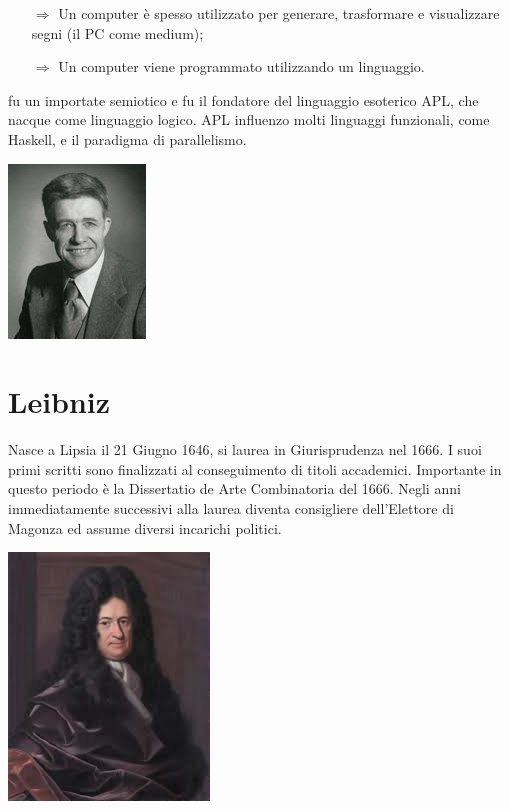 \begin{itemize}
    \item [$\Rightarrow$] Un computer è spesso utilizzato per generare, trasformare e visualizzare segni (il PC come medium);
    \item [$\Rightarrow$] Un computer viene programmato utilizzando un linguaggio.
\end{itemize}

 fu un importate semiotico e fu il fondatore del linguaggio esoterico APL, che nacque come linguaggio logico. APL influenzo molti linguaggi funzionali, come Haskell, e il paradigma di parallelismo.

\begin{center}
    \includegraphics[scale = 1]{images/iverson.jpg}
\end{center}


\section{Leibniz}

Nasce a Lipsia il 21 Giugno 1646, si laurea in Giurisprudenza nel 1666.
I suoi primi scritti sono finalizzati al conseguimento di titoli accademici. Importante in
questo periodo è la Dissertatio de Arte Combinatoria del 1666.
Negli anni immediatamente successivi alla laurea diventa consigliere dell’Elettore di
Magonza ed assume diversi incarichi politici.

\begin{center}
\includegraphics[scale = 0.7]{images/Leibniz.jpg}
\end{center}

